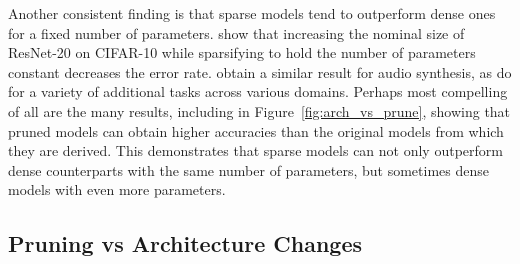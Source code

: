 Another consistent finding is that sparse models tend to outperform dense ones for a fixed number of parameters. \citet{snip-followup} show that increasing the nominal size of ResNet-20 on CIFAR-10 while sparsifying to hold the number of parameters constant decreases the error rate. \citet{wavernn} obtain a similar result for audio synthesis, as do \citet{openai-block-sparse} for a variety of additional tasks across various domains. Perhaps most compelling of all are the many results, including in Figure~\ref{fig:arch_vs_prune}, showing that pruned models can obtain higher accuracies than the original models from which they are derived. This demonstrates that sparse models can not only outperform dense counterparts with the same number of parameters, but sometimes dense models with even more parameters.

\subsection{Pruning vs Architecture Changes}

